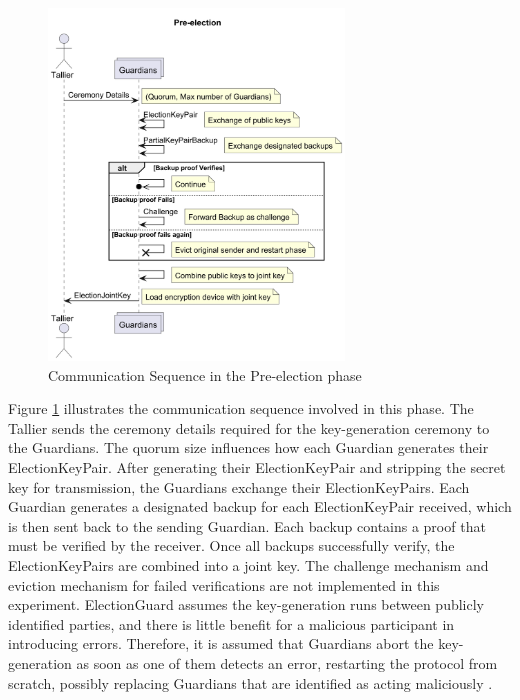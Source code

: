 \begin{figure}
    \centering
    \includegraphics[width=0.7\textwidth]{abbildungen/Diagramme/communication-seq0.png}
    \caption{Communication Sequence in the Pre-election phase}
    \label{Fig:comm-pre}
\end{figure}

Figure \ref{Fig:comm-pre} illustrates the communication sequence involved in this phase. The Tallier sends the ceremony details required for the key-generation ceremony to the Guardians. The quorum size influences how each Guardian generates their ElectionKeyPair. After generating their ElectionKeyPair and stripping the secret key for transmission, the Guardians exchange their ElectionKeyPairs. Each Guardian generates a designated backup for each ElectionKeyPair received, which is then sent back to the sending Guardian. Each backup contains a proof that must be verified by the receiver. Once all backups successfully verify, the ElectionKeyPairs are combined into a joint key. The challenge mechanism and eviction mechanism for failed verifications are not implemented in this experiment. ElectionGuard assumes the key-generation runs between publicly identified parties, and there is little benefit for a malicious participant in introducing errors. Therefore, it is assumed that Guardians abort the key-generation as soon as one of them detects an error, restarting the protocol from scratch, possibly replacing Guardians that are identified as acting maliciously \cite[9]{eg-paper}. 

